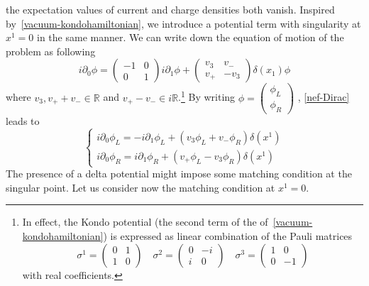 \ie the expectation values of current and charge densities both vanish. 
Inspired by~\cref{vacuum-kondohamiltonian}, we introduce a potential term with singularity at $x^1 = 0$ in the same manner.
We can write down the equation of motion of the problem as following
\begin{equation}\label{nef-Dirac}
i \partial_0 \phi = 
\begin{pmatrix} 
-1 & 0 \\
0 & 1 
\end{pmatrix} i \partial_1 \phi +
\begin{pmatrix}
v_3 & v_- \\
v_+ & -v_3
\end{pmatrix} \delta(x_1) \phi
\end{equation}
where $v_3, v_+ + v_- \in \mathbb{R}$ and $ v_+ - v_-\in i \mathbb{R}$.\footnote{
In effect, the Kondo potential (the second term of the \rhs of~\cref{vacuum-kondohamiltonian}) is expressed as linear combination of the Pauli matrices
\begin{equation*}
\sigma^1 = \begin{pmatrix} 0 & 1 \\ 1 & 0 \end{pmatrix} \quad
\sigma^2 = \begin{pmatrix} 0 & -i \\ i & 0 \end{pmatrix} \quad
\sigma^3 = \begin{pmatrix} 1 & 0 \\ 0 & -1 \end{pmatrix} 
\end{equation*}
with real coefficients.
}
By writing $\phi =
\begin{pmatrix}
\phi_L \\
\phi_R
\end{pmatrix}$
, \cref{nef-Dirac} leads to
\begin{equation}
\begin{cases}
i \partial_0 \phi_L = -i\partial_1 \phi_L + (v_3 \phi_L + v_- \phi_R) \delta(x^1) \\
i \partial_0 \phi_R = i\partial_1 \phi_R + (v_+ \phi_L - v_3 \phi_R) \delta(x^1)
\end{cases}
\end{equation}
The presence of a delta potential might impose some matching condition at the singular point.
Let us consider now the matching condition at $x^1=0$.

